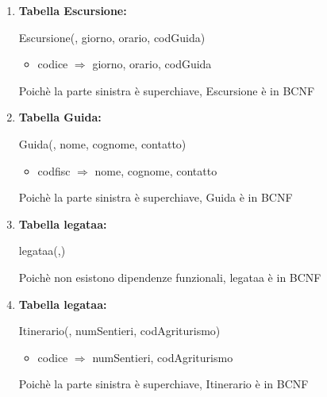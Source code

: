 \documentclass[12pt,a4paper]{article}
\begin{document}
\begin{enumerate}
\item[] \textbf{Tabella Escursione:}

Escursione(\underline{}, giorno, orario,  codGuida)
\begin{itemize}
\vspace{-5pt}
\item codice $\Rightarrow$ giorno, orario, codGuida
\vspace{-5pt}
\end{itemize}
Poichè la parte sinistra è superchiave, Escursione è in BCNF
\vspace{10pt}



\item[] \textbf{Tabella Guida:}

Guida(\underline{}, nome, cognome, contatto)
\begin{itemize}
\vspace{-5pt}
\item codfisc $\Rightarrow$ nome, cognome, contatto
\vspace{-5pt}
\end{itemize}
Poichè la parte sinistra è superchiave, Guida è in BCNF
\vspace{10pt}



\item[] \textbf{Tabella legataa:}

legataa(\underline{},\underline{})

Poichè non esistono dipendenze funzionali, legataa è in BCNF
\vspace{10pt}



\item[] \textbf{Tabella legataa:}

Itinerario(\underline{}, numSentieri, codAgriturismo)
\begin{itemize}
\vspace{-5pt}
\item codice $\Rightarrow$ numSentieri, codAgriturismo
\vspace{-5pt}
\end{itemize}
Poichè la parte sinistra è superchiave, Itinerario è in BCNF
\vspace{10pt}




\end{enumerate}
\end{document}
